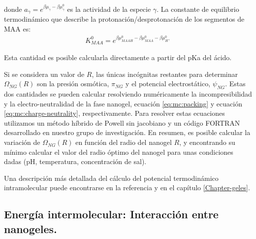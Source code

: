 	\noindent donde $a_\gamma = e^{\beta\mu_\gamma-\beta\mu_\gamma^0}$ es la actividad de la especie $\gamma$. 
	La constante de equilibrio termodin\'amico que describe la protonaci\'on/desprotonaci\'on de los segmentos de MAA es:
	\begin{align}
		K^0_{MAA}= e^{\beta\mu^0_{MAAH}-\beta\mu^0_{MAA}-\beta\mu^0_{H^+}}
	\end{align}
	
	\noindent Esta cantidad es posible calcularla directamente a partir del pKa del \'acido.
	
	
	Si se considera  un valor de  $R$, las \'unicas inc\'ognitas restantes para determinar $\Omega_{NG}(R)$ son la presi\'on osm\'otica, $\pi_{NG}$ y el potencial electrost\'atico, $\psi_{NG}$.
	Estas dos cantidades se pueden calcular resolviendo num\'ericamente la incompresibilidad y la electro-neutralidad de la fase nanogel, ecuaci\'on \ref{eq:mc:packing} y ecuaci\'on \ref{eq:mc:charge-neutrality}, respectivamente.
	Para resolver estas ecuaciones utilizamos un m\'etodo h\'ibrido de Powell sin jacobiano y un c\'odigo FORTRAN desarrollado en nuestro grupo de investigaci\'on.
	En resumen, es posible calcular la variaci\'on de  $\Omega_{NG}(R)$ en funci\'on del radio del nanogel $R$, y encontrando su m\'inimo calcular el valor del radio \'optimo del nanogel para unas condiciones dadas (pH, temperatura, concentraci\'on de sal).
	
	Una descripci\'on m\'as detallada del c\'alculo del potencial termodin\'amico intramolecular puede encontrarse en la referencia  \cite{perez2021thermodynamic} y en el cap\'itulo \ref{Chapter-geles}.
	
	\subsection{Energ\'ia intermolecular: Interacci\'on entre nanogeles.}\label{sec:mc:energia_intra}
	

	
